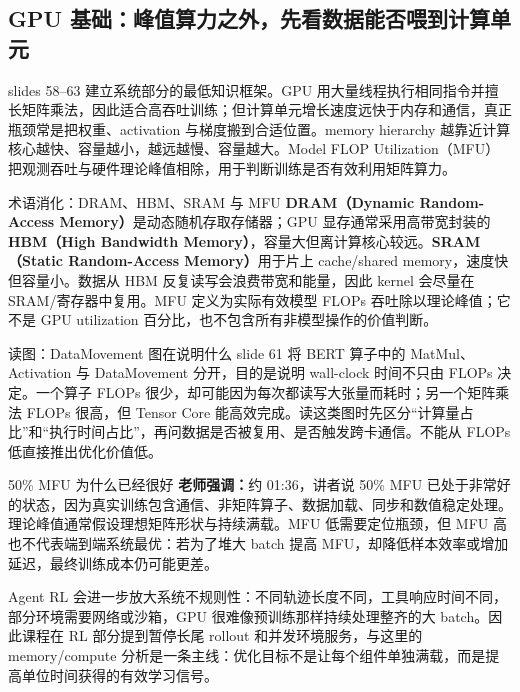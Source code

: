 \subsection{GPU 基础：峰值算力之外，先看数据能否喂到计算单元}

slides 58--63 建立系统部分的最低知识框架。GPU 用大量线程执行相同指令并擅长矩阵乘法，因此适合高吞吐训练；但计算单元增长速度远快于内存和通信，真正瓶颈常是把权重、activation 与梯度搬到合适位置。memory hierarchy 越靠近计算核心越快、容量越小，越远越慢、容量越大。Model FLOP Utilization（MFU）把观测吞吐与硬件理论峰值相除，用于判断训练是否有效利用矩阵算力。


\begin{knowledgebox}{术语消化：DRAM、HBM、SRAM 与 MFU}
\textbf{DRAM（Dynamic Random-Access Memory）}是动态随机存取存储器；GPU 显存通常采用高带宽封装的 \textbf{HBM（High Bandwidth Memory）}，容量大但离计算核心较远。\textbf{SRAM（Static Random-Access Memory）}用于片上 cache/shared memory，速度快但容量小。数据从 HBM 反复读写会浪费带宽和能量，因此 kernel 会尽量在 SRAM/寄存器中复用。MFU 定义为实际有效模型 FLOPs 吞吐除以理论峰值；它不是 GPU utilization 百分比，也不包含所有非模型操作的价值判断。
\end{knowledgebox}

\begin{knowledgebox}{读图：DataMovement 图在说明什么}
slide 61 将 BERT 算子中的 MatMul、Activation 与 DataMovement 分开，目的是说明 wall-clock 时间不只由 FLOPs 决定。一个算子 FLOPs 很少，却可能因为每次都读写大张量而耗时；另一个矩阵乘法 FLOPs 很高，但 Tensor Core 能高效完成。读这类图时先区分“计算量占比”和“执行时间占比”，再问数据是否被复用、是否触发跨卡通信。不能从 FLOPs 低直接推出优化价值低。
\end{knowledgebox}

\begin{warningbox}{50\% MFU 为什么已经很好}
\textbf{老师强调：}约 01:36，讲者说 50\% MFU 已处于非常好的状态，因为真实训练包含通信、非矩阵算子、数据加载、同步和数值稳定处理。理论峰值通常假设理想矩阵形状与持续满载。MFU 低需要定位瓶颈，但 MFU 高也不代表端到端系统最优：若为了堆大 batch 提高 MFU，却降低样本效率或增加延迟，最终训练成本仍可能更差。
\end{warningbox}

Agent RL 会进一步放大系统不规则性：不同轨迹长度不同，工具响应时间不同，部分环境需要网络或沙箱，GPU 很难像预训练那样持续处理整齐的大 batch。因此课程在 RL 部分提到暂停长尾 rollout 和并发环境服务，与这里的 memory/compute 分析是一条主线：优化目标不是让每个组件单独满载，而是提高单位时间获得的有效学习信号。

